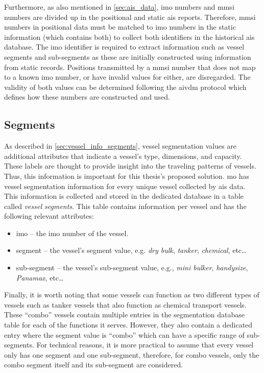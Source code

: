 Furthermore, as also mentioned in \cref{sec:ais_data}, \acrshort{imo} numbers and \acrshort{mmsi} numbers are divided up in the positional and static \acrshort{ais} reports. Therefore, \acrshort{mmsi} numbers in positional data must be matched to \acrshort{imo} numbers in the static information (which contains both) to collect both identifiers in the historical \acrshort{ais} database. The \acrshort{imo} identifier is required to extract information such as vessel segments and sub-segments as these are initially constructed using information from static records. Positions transmitted by a \acrshort{mmsi} number that does not map to a known \acrshort{imo} number, or have invalid values for either, are disregarded. The validity of both values can be determined following the \gls{aivdm} protocol which defines how these numbers are constructed and used.

\subsection{Segments}

As described in \cref{sec:vessel_info_segments}, vessel segmentation values are additional attributes that indicate a vessel's type, dimensions, and capacity. These labels are thought to provide insight into the traveling patterns of vessels. Thus, this information is important for this thesis's proposed solution. \acrshort{mo} has vessel segmentation information for every unique vessel collected by \acrshort{ais} data. This information is collected and stored in the dedicated database in a table called \textit{vessel segments}. This table contains information per vessel and has the following relevant attributes:

\begin{itemize}
    \item imo -- the \acrshort{imo} number of the vessel.
    \item segment -- the vessel's segment value, e.g. \textit{dry bulk}, \textit{tanker}, \textit{chemical}, etc\ldots
    \item sub-segment -- the vessel's sub-segment value, e.g., \textit{mini bulker}, \textit{handysize}, \textit{Panamax}, etc\ldots
\end{itemize}

Finally, it is worth noting that some vessels can function as two different types of vessels such as tanker vessels that also function as chemical transport vessels. These ``combo'' vessels contain multiple entries in the segmentation database table for each of the functions it serves. However, they also contain a dedicated entry where the segment value is ``combo'' which can have a specific range of sub-segments. For technical reasons, it is more practical to assume that every vessel only has one segment and one sub-segment, therefore, for combo vessels, only the combo segment itself and its sub-segment are considered.


